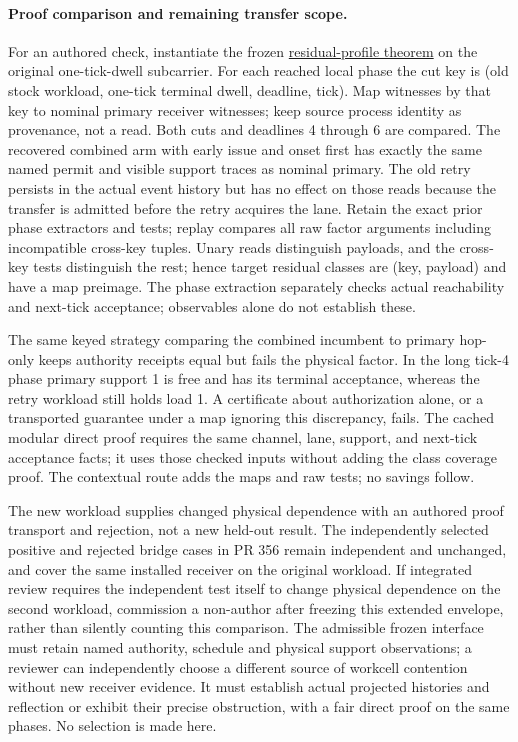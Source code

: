 \documentclass[11pt]{article}
\begin{document}
\paragraph{Proof comparison and remaining transfer scope.}
For an authored check, instantiate the frozen \href{https://github.com/eternal-november/eos-research-programmes/blob/e1348964f73704212d2d8b48d5982a5ed600a2ff/projects/contextual-composition/feedback-and-concurrency/observable-covers/Residual_Profiles_and_Admission_Reflection.tex}{residual-profile theorem} on the original one-tick-dwell subcarrier. For each reached local phase the cut key is (old stock workload, one-tick terminal dwell, deadline, tick). Map witnesses by that key to nominal primary receiver witnesses; keep source process identity as provenance, not a read. Both cuts and deadlines 4 through 6 are compared. The recovered combined arm with early issue and onset first has exactly the same named permit and visible support traces as nominal primary. The old retry persists in the actual event history but has no effect on those reads because the transfer is admitted before the retry acquires the lane. Retain the exact prior phase extractors and tests; replay compares all raw factor arguments including incompatible cross-key tuples. Unary reads distinguish payloads, and the cross-key tests distinguish the rest; hence target residual classes are (key, payload) and have a map preimage. The phase extraction separately checks actual reachability and next-tick acceptance; observables alone do not establish these.

The same keyed strategy comparing the combined incumbent to primary hop-only keeps authority receipts equal but fails the physical factor. In the long tick-4 phase primary support 1 is free and has its terminal acceptance, whereas the retry workload still holds load 1. A certificate about authorization alone, or a transported guarantee under a map ignoring this discrepancy, fails. The cached modular direct proof requires the same channel, lane, support, and next-tick acceptance facts; it uses those checked inputs without adding the class coverage proof. The contextual route adds the maps and raw tests; no savings follow.

The new workload supplies changed physical dependence with an authored proof transport and rejection, not a new held-out result. The independently selected positive and rejected bridge cases in PR 356 remain independent and unchanged, and cover the same installed receiver on the original workload. If integrated review requires the independent test itself to change physical dependence on the second workload, commission a non-author after freezing this extended envelope, rather than silently counting this comparison. The admissible frozen interface must retain named authority, schedule and physical support observations; a reviewer can independently choose a different source of workcell contention without new receiver evidence. It must establish actual projected histories and reflection or exhibit their precise obstruction, with a fair direct proof on the same phases. No selection is made here.
\end{document}
